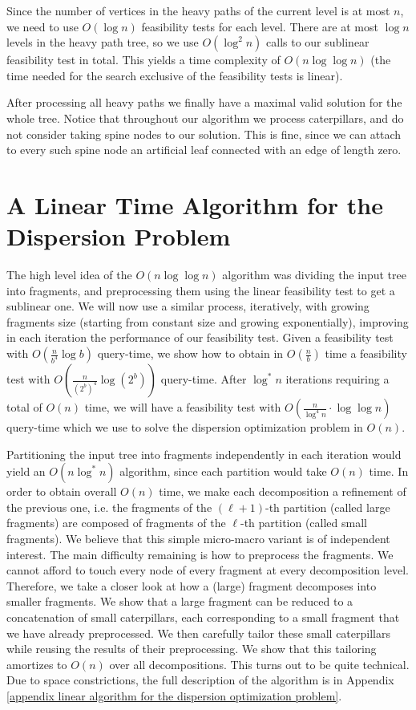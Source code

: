 \documentclass[a4paper,UKenglish]{lipics-v2016}
\theoremstyle{plain}
\begin{document}
Since the number of vertices in the heavy paths of the current level is at most $n$, we need to use $O(\log n)$ feasibility tests for each level. There are at most $\log n$ levels in the heavy path tree, so we use $O(\log ^2n)$ calls to our sublinear feasibility test in total. This yields a time complexity of $O(n \log \log n)$ (the time needed for the search exclusive of the feasibility tests is linear).

After processing all heavy paths we finally have a maximal valid solution for the whole tree.
Notice that throughout our algorithm we process caterpillars, and do not consider taking spine nodes to our solution. 
This is fine, since we can attach to every such spine node an artificial leaf connected with an edge of length zero.

\section{A Linear Time Algorithm for the Dispersion Problem}
\label{sectionLinear}

The high level idea of the $O(n \log \log n)$ algorithm was dividing the input tree into fragments, and preprocessing them using the linear feasibility test to get a sublinear one. We will now use a similar process, iteratively, with growing fragments size (starting from constant size and growing exponentially), improving in each iteration the performance of our feasibility test. Given a feasibility test with $O(\frac{n}{b^4}\log b)$ query-time, we show how to obtain in $O(\frac{n}{b})$ time a feasibility test with $O(\frac{n}{(2^b)^{4}}\log (2^b))$ query-time.
After $\log ^*n$ iterations requiring a total of $O(n)$ time, we will have a feasibility test with $O(\frac{n}{\log ^4n} \cdot \log \log n)$ query-time
which we use to solve the dispersion optimization problem in $O(n)$. 

Partitioning the input tree into fragments independently in each iteration would yield an $O(n \log ^* n)$ algorithm, since each partition would take $O(n)$ time. In order to obtain overall $O(n)$ time, we make each decomposition a refinement of the previous one, i.e. the fragments of the $(\ell+1)$-th partition (called large fragments) are composed of fragments of the $\ell$-th partition (called small fragments). We believe that this simple micro-macro variant is of independent interest. 
%
The main difficulty remaining is how to preprocess the fragments. We cannot afford to touch every node of every fragment at every decomposition level. Therefore, we take a closer look at how a (large) fragment decomposes into smaller fragments. 
We show that a large fragment can be reduced to a concatenation of small caterpillars, each corresponding to a small fragment that we have already preprocessed. We then  carefully tailor these small caterpillars while reusing the results of their preprocessing. We show that this tailoring amortizes to $O(n)$ over all decompositions. This turns out to be quite technical. Due to space constrictions, the full description of the algorithm is in Appendix \ref{appendix linear algorithm for the dispersion optimization problem}.
\end{document}
